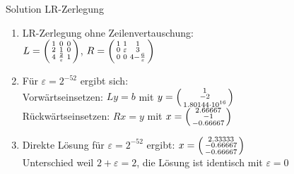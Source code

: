 \begin{KR}{Solution LR-Zerlegung}
\begin{enumerate}
    \item LR-Zerlegung ohne Zeilenvertauschung:\\
    $L = \begin{psmallmatrix}
    1 & 0 & 0\\
    2 & 1 & 0\\
    4 & \frac{2}{\varepsilon} & 1
    \end{psmallmatrix}$,
    $R = \begin{psmallmatrix}
    1 & 1 & 1\\
    0 & \varepsilon & 3\\
    0 & 0 & 4-\frac{6}{\varepsilon}
    \end{psmallmatrix}$
    \vspace{1mm}
    \item Für $\varepsilon = 2^{-52}$ ergibt sich:\\
    Vorwärtseinsetzen: $Ly = b$ mit $y = \begin{psmallmatrix}1\\-2\\1.80144\cdot 10^{16}\end{psmallmatrix}$\\
    Rückwärtseinsetzen: $Rx = y$ mit $x = \begin{psmallmatrix}2.66667\\-1\\-0.66667\end{psmallmatrix}$
    \vspace{1mm}
    \item Direkte Lösung für $\varepsilon = 2^{-52}$ ergibt:
    $x = \begin{psmallmatrix}2.33333\\-0.66667\\-0.66667\end{psmallmatrix}$\\
    Unterschied weil $2 + \varepsilon = 2$, die Lösung ist identisch mit $\varepsilon = 0$
\end{enumerate}
\end{KR}




